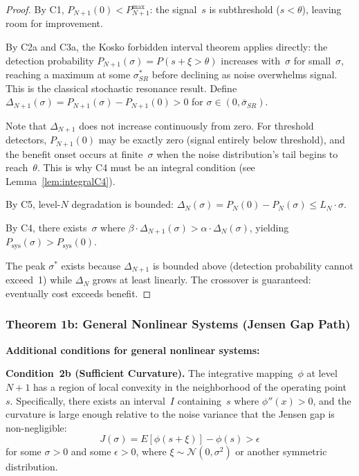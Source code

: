 \documentclass[12pt,letterpaper]{article}
\theoremstyle{definition}
\theoremstyle{remark}
\newcommand{\Psys}{P_{\text{sys}}}
\newcommand{\Pn}{P_N}
\newcommand{\Pnp}{P_{N+1}}
\begin{document}
\begin{proof}
By C1, $\Pnp(0) < P_{N+1}^{\max}$: the signal~$s$ is subthreshold ($s < \theta$), leaving room for improvement.

By C2a and C3a, the Kosko forbidden interval theorem applies directly: the detection probability $\Pnp(\sigma) = P(s + \xi > \theta)$ increases with~$\sigma$ for small~$\sigma$, reaching a maximum at some $\sigma_{SR}^*$ before declining as noise overwhelms signal. This is the classical stochastic resonance result. Define $\Delta_{N+1}(\sigma) = \Pnp(\sigma) - \Pnp(0) > 0$ for $\sigma \in (0, \bar{\sigma}_{SR})$.

Note that $\Delta_{N+1}$ does not increase continuously from zero. For threshold detectors, $\Pnp(0)$ may be exactly zero (signal entirely below threshold), and the benefit onset occurs at finite~$\sigma$ when the noise distribution's tail begins to reach~$\theta$. This is why C4 must be an integral condition (see Lemma~\ref{lem:integralC4}).

By C5, level-$N$ degradation is bounded: $\Delta_N(\sigma) = \Pn(0) - \Pn(\sigma) \leq L_N \cdot \sigma$.

By C4, there exists~$\sigma$ where $\beta \cdot \Delta_{N+1}(\sigma) > \alpha \cdot \Delta_N(\sigma)$, yielding $\Psys(\sigma) > \Psys(0)$.

The peak $\sigma^*$ exists because $\Delta_{N+1}$ is bounded above (detection probability cannot exceed~1) while $\Delta_N$ grows at least linearly. The crossover is guaranteed: eventually cost exceeds benefit.
\end{proof}


\subsubsection{Theorem 1b: General Nonlinear Systems (Jensen Gap Path)}

\textbf{Additional conditions for general nonlinear systems:}

\medskip
\noindent\textbf{Condition~2b (Sufficient Curvature).} The integrative mapping~$\phi$ at level~$N{+}1$ has a region of local convexity in the neighborhood of the operating point~$s$. Specifically, there exists an interval~$I$ containing~$s$ where $\phi''(x) > 0$, and the curvature is large enough relative to the noise variance that the Jensen gap is non-negligible:
\begin{equation}
J(\sigma) = E[\phi(s + \xi)] - \phi(s) > \epsilon
\end{equation}
for some $\sigma > 0$ and some $\epsilon > 0$, where $\xi \sim \mathcal{N}(0, \sigma^2)$ or another symmetric distribution.
\end{document}

